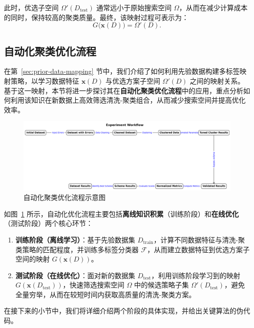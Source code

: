 \documentclass[10pt]{article} %
\numberwithin{equation}{section}
\begin{document}
此时，优选子空间 $\Omega'(D_{\text{test}})$ 通常远小于原始搜索空间 $\Omega$，从而在减少计算成本的同时，保持较高的聚类质量。最终，该映射过程可表示为：
\begin{equation}\label{eq:mapping-function}
G\bigl(\mathbf{x}(D)\bigr) = \Omega'(D).
\end{equation}

\subsection{自动化聚类优化流程}
\label{sec:autocluster-process}

在第~\ref{sec:prior-data-mapping} 节中，我们介绍了如何利用先验数据构建多标签映射策略，以学习数据特征 $\mathbf{x}(D)$ 与优选方案子空间 $\Omega'(D)$ 之间的映射关系。基于这一映射，本节将进一步探讨其在\textbf{自动化聚类优化流程}中的应用，重点分析如何利用该知识在新数据上高效筛选清洗-聚类组合，从而减少搜索空间并提高优化效率。

\begin{figure}[htbp]
  \centering
  \includegraphics[width=0.8\linewidth]{autocluster_workflow.png}
  \caption{自动化聚类优化流程示意图}
  \label{fig:autocluster-workflow}
\end{figure}

如图~\ref{fig:autocluster-workflow} 所示，自动化优化流程主要包括\textbf{离线知识积累}（训练阶段）和\textbf{在线优化}（测试阶段）两个核心环节： \begin{enumerate} \item \textbf{训练阶段（离线学习）}：基于先验数据集 $D_{\text{train}}$，计算不同数据特征与清洗-聚类策略的匹配程度，并训练多标签分类器 $\mathcal{F}$，从而建立数据特征到优选方案子空间的映射 $G(\mathbf{x}(D))$。 \item \textbf{测试阶段（在线优化）}：面对新的数据集 $D_{\text{test}}$，利用训练阶段学习到的映射 $G(\mathbf{x}(D_{\text{test}}))$，快速筛选搜索空间 $\Omega$ 中的候选策略子集 $\Omega'(D_{\text{test}})$，避免全量穷举，从而在较短时间内获取高质量的清洗-聚类方案。 \end{enumerate}

在接下来的小节中，我们将详细介绍两个阶段的具体实现，并给出关键算法的伪代码。
\end{document}
